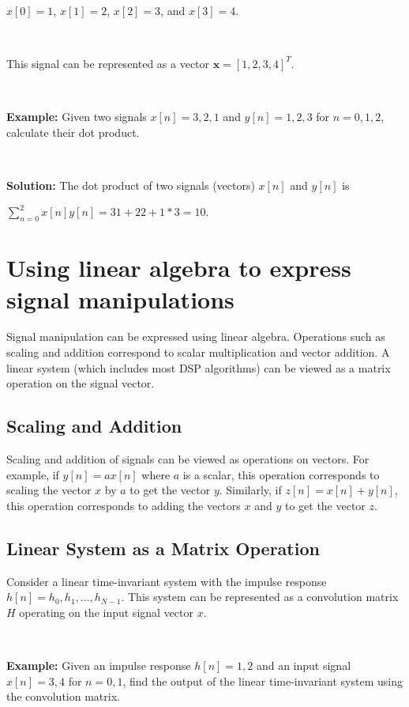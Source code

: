 \documentclass[11pt]{article}
\begin{document}
\ 

$x[0] = 1$, $x[1] = 2$, $x[2] = 3$, and $x[3] = 4$. 

\ 

This signal can be represented as a vector $\mathbf{x} = [1, 2, 3, 4]^T$.


\ 


\noindent \textbf{Example:} Given two signals $x[n] = {3, 2, 1}$ and $y[n] = {1, 2, 3}$ for $n = {0, 1, 2}$, calculate their dot product.

\ 


\noindent \textbf{Solution:} The dot product of two signals (vectors) $x[n]$ and $y[n]$ is 

$\sum_{n=0}^{2} x[n] y[n] = 31 + 22 + 1*3 = 10$.

\section*{Using linear algebra to express signal manipulations}

Signal manipulation can be expressed using linear algebra. Operations such as scaling and addition correspond to scalar multiplication and vector addition. A linear system (which includes most DSP algorithms) can be viewed as a matrix operation on the signal vector.

\subsection*{Scaling and Addition}
Scaling and addition of signals can be viewed as operations on vectors. For example, if $y[n] = a x[n]$ where $a$ is a scalar, this operation corresponds to scaling the vector $x$ by $a$ to get the vector $y$. Similarly, if $z[n] = x[n] + y[n]$, this operation corresponds to adding the vectors $x$ and $y$ to get the vector $z$.

\subsection*{Linear System as a Matrix Operation}
Consider a linear time-invariant system with the impulse response $h[n] = {h_0, h_1, ..., h_{N-1}}$. This system can be represented as a convolution matrix $H$ operating on the input signal vector $x$.

\ 

\noindent \textbf{Example:} Given an impulse response $h[n] = {1, 2}$ and an input signal $x[n] = {3, 4}$ for $n = {0, 1}$, find the output of the linear time-invariant system using the convolution matrix.
\end{document}
